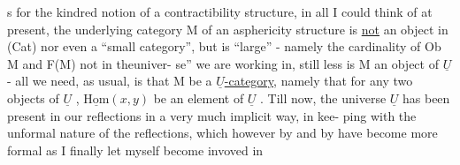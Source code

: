 \hand{(}s for the kindred notion of a contractibility structure, in all  
I could think of at present, the underlying category M of an asphericity
structure is \uline{not} an object in (Cat) nor even a ``small category'', but is
``large'' - namely the cardinality of Ob M and F(M)  not in theuniver-%
se'' we are working in,  still less is M an object of $\underline{U}$ -
all we need, as usual, is that M be a \uline{$\underline{U}$-category}, namely that for any
two objects of $\underline{U}$ , $\underline{\mathrm{Hom}}(x,y)$ be an element of $\underline{U}$ . Till now, the universe
$\underline{U}$ has been present in our reflections in a very much implicit way, in kee-%
ping with the unformal nature of the reflections, which however by and by
have become more formal\deleted{,} \hand{(}as I finally let myself become invoved in
